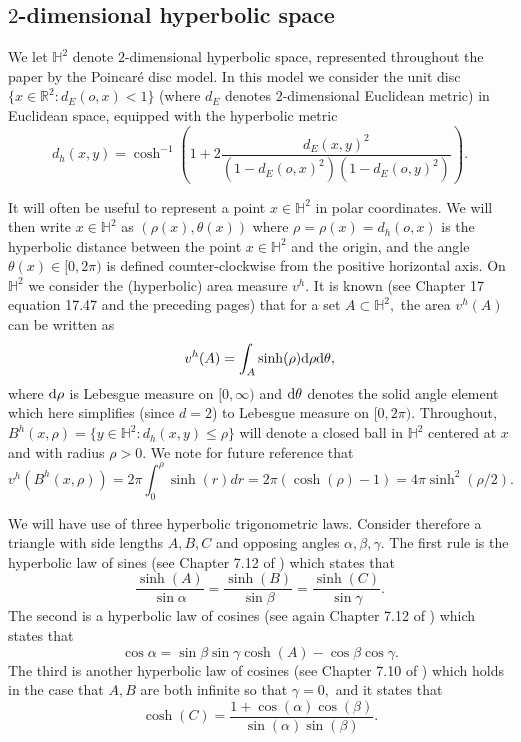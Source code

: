 \documentclass[a4paper,12pt]{article}
\newcommand{\BH}{{\mathbb{H}}}
\newcommand{\BR}{{\mathbb{R}}}
\newcommand{\dd}{{\rm d}}
\begin{document}
\subsection{$2$-dimensional hyperbolic space} \label{sec:2dhyp}
We let $\BH^2$ denote $2$-dimensional hyperbolic space, represented throughout the paper 
by the Poincar\'e disc model. In this model we consider the unit disc 
$\{x\in \BR^2: d_E(o,x)<1\}$ 
(where $d_E$ denotes $2$-dimensional Euclidean metric) in Euclidean space,
equipped with the hyperbolic metric 
\[
d_h(x,y)=\cosh^{-1}\left(1+2\frac{d_E(x,y)^2}{(1-d_E(o,x)^2)(1-d_E(o,y)^2)}\right).
\]


It will often be useful to represent a point $x\in \BH^2$ in polar coordinates. 
We will then write $x\in \BH^2$ as $(\rho(x),\theta(x))$ where $\rho=\rho(x)=d_h(o,x)$ is 
the hyperbolic distance between the point $x\in \BH^2$ and the origin, 
and the angle $\theta(x)\in [0, 2 \pi)$ is defined 
counter-clockwise from the positive horizontal axis.
On $\BH^2$ we consider the (hyperbolic) area measure $v^h.$ It is known 
(see \cite{S_04}  Chapter 17 equation 17.47 and the preceding pages) that for a set $A\subset \BH^2,$ 
the area $v^h(A)$ can be written as
\begin{equation} \label{eqn:volumemeasureH}
   v^h(A)=\int_A \sinh(\rho) \dd\rho \dd\theta, 
\end{equation}
where $\dd \rho$ is Lebesgue measure on $[0,\infty)$ and $ \dd \theta$ denotes the solid angle element 
which here simplifies (since $d=2$) to Lebesgue measure on $[0,2\pi).$
Throughout, $B^h(x,\rho)=\{y\in \BH^2: d_h(x,y)\leq \rho\}$ will denote a closed 
 ball in 
$\BH^2$ centered at $x$ and with radius $\rho>0.$ We note for future reference that 
\begin{equation} \label{eqn:volhypball}
    v^h(B^h(x,\rho))=2 \pi \int_0^\rho \sinh(r)dr=2 \pi (\cosh(\rho)-1)
    =4\pi \sinh^2(\rho/2).
\end{equation}

We will have use of three hyperbolic trigonometric laws.  
Consider therefore a triangle
with side lengths $A,B,C$ and opposing angles $\alpha,\beta,\gamma.$ The first rule 
is the hyperbolic law of sines (see Chapter 7.12 
of \cite{B_93}) which states that 
\begin{equation} \label{eqn:hypsinerule}
\frac{\sinh(A)}{\sin \alpha}=\frac{\sinh(B)}{\sin \beta}=\frac{\sinh(C)}{\sin \gamma}.
\end{equation}
The second is a hyperbolic law of cosines (see again Chapter 7.12 
of \cite{B_93})
which states that 
\begin{equation} \label{eqn:hypcosinerule}
\cos \alpha= \sin \beta \sin \gamma \cosh(A)-\cos \beta \cos \gamma.   
\end{equation}
The third is another hyperbolic law of cosines (see Chapter 7.10 of \cite{B_93})
which holds in the case that $A,B$ are both infinite
so that $\gamma=0,$ and it states that
\begin{equation}\label{eqn:hypcosinerule_infinite}
\cosh(C)=\frac{1+\cos(\alpha)\cos(\beta)}{\sin(\alpha)\sin(\beta)}.    
\end{equation}
\end{document}
